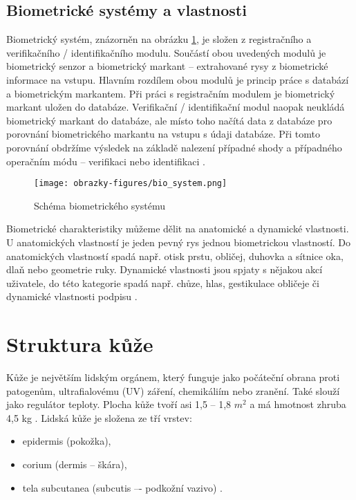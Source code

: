 \subsection*{Biometrické systémy a vlastnosti}
Biometrický systém, znázorněn na obrázku \ref{fig:biosystem}, je složen z registračního a verifikačního / identifikačního modulu. Součástí obou uvedených modulů je biometrický senzor a biometrický markant -- extrahované rysy z biometrické informace na vstupu. Hlavním rozdílem obou modulů je princip práce s databází a biometrickým markantem.  Při práci s registračním modulem je biometrický markant uložen do databáze. Verifikační / identifikační modul naopak neukládá biometrický markant do databáze, ale místo toho načítá data z databáze pro porovnání biometrického markantu na vstupu s údaji databáze. Při tomto porovnání obdržíme výsledek na základě nalezení případné shody a případného operačním módu -- verifikaci nebo identifikaci \cite{BIOopora}.

\begin{figure}[!htbp]
    \centering
    \texttt{[image: obrazky-figures/bio\_system.png]}
    \caption{Schéma biometrického systému \cite{BIOopora}}
    \label{fig:biosystem}
\end{figure}

Biometrické charakteristiky můžeme dělit na anatomické a dynamické vlastnosti. U anatomických vlastností je jeden pevný rys jednou biometrickou vlastností. Do anatomických vlastností spadá např. otisk prstu, obličej, duhovka a sítnice oka, dlaň nebo geometrie ruky. Dynamické vlastnosti jsou spjaty s nějakou akcí uživatele, do této kategorie spadá např. chůze, hlas, gestikulace obličeje či dynamické vlastnosti podpisu \cite{BIOopora}. 
\section{Struktura kůže}
Kůže je největším lidským orgánem, který funguje jako počáteční obrana proti patogenům, ultrafialovému (UV) záření, chemikáliím nebo zranění. Také slouží jako regulátor teploty. Plocha kůže tvoří asi 1,5 -- 1,8 $m^2$ a má hmotnost zhruba 4,5 kg \cite{ZakladyFunkcniAnatomieCloveka}. 
Lidská kůže je složena ze tří vrstev:
\begin{itemize}
    \item epidermis (pokožka),
    \item corium (dermis -- škára),
    \item tela subcutanea (subcutis –- podkožní vazivo)  \cite{ZakladyFunkcniAnatomieCloveka}.
\end{itemize}

